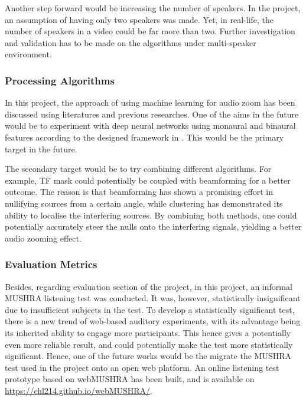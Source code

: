 \documentclass[a4paper,twoside,12pt,hidelinks]{article}
\begin{document}
Another step forward would be increasing the number of speakers. In the project, an assumption of having only two speakers was made. Yet, in real-life, the number of speakers in a video could be far more than two. Further investigation and validation has to be made on the algorithms under multi-speaker environment.

\subsubsection{Processing Algorithms}
In this project, the approach of using machine learning for audio zoom has been discussed using literatures and previous researches. One of the aims in the future would be to experiment with deep neural networks using monaural and binaural features according to the designed framework in . This would be the primary target in the future.

The secondary target would be to try combining different algorithms. For example, TF mask could potentially be coupled with beamforming for a better outcome. The reason is that beamforming has shown a promising effort in nullifying sources from a certain angle, while clustering has demonstrated its ability to localise the interfering sources. By combining both methods, one could potentially accurately steer the nulls onto the interfering signals, yielding a better audio zooming effect.

\subsubsection{Evaluation Metrics}
\label{sect:evaluationfuture}
Besides, regarding evaluation section of the project, in this project, an informal MUSHRA listening test was conducted. It was, however, statistically insignificant due to insufficient subjects in the test. To develop a statistically significant test, there is a new trend of web-based auditory experiments, with its advantage being its inherited ability to engage more participants. This hence gives a potentially even more reliable result, and could potentially make the test more statistically significant. Hence, one of the future works would be the migrate the MUSHRA test used in the project onto an open web platform. An online listening test prototype based on webMUSHRA \cite{Schoeffler2015wac} has been built, and is available on \url{https://chl214.github.io/webMUSHRA/}.
\end{document}
